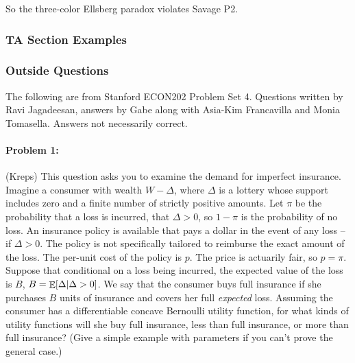 \documentclass[12pt]{article}
\begin{document}
\begin{enumerate}
	So the three-color Ellsberg paradox violates Savage P2.
\end{enumerate}



\subsubsection{TA Section Examples}

\subsubsection{Outside Questions}

The following are from Stanford ECON202 Problem Set 4. Questions written by Ravi Jagadeesan, answers by Gabe along with Asia-Kim Francavilla and Monia Tomasella. Answers not necessarily correct.

\paragraph{Problem 1:} (Kreps) This question asks you to examine the demand for imperfect insurance. Imagine a consumer with wealth $W - \Delta$, where $\Delta$ is a lottery whose support includes zero and a finite number of strictly positive amounts. Let $\pi$ be the probability that a loss is incurred, \ie that $\Delta > 0$, so $1 - \pi$ is the probability of no loss. An insurance policy is available that pays a dollar in the event of any loss -- \ie if $\Delta > 0$. The policy is not specifically tailored to reimburse the exact amount of the loss. The per-unit cost of the policy is $p$. The price is actuarily fair, so $p = \pi$. Suppose that conditional on a loss being incurred, the expected value of the loss is $B$, \ie $B = \mathop{\mathbb{E}}[\Delta | \Delta > 0]$. We say that the consumer buys full insurance if she purchases $B$ units of insurance and covers her full \emph{expected} loss. Assuming the consumer has a differentiable concave Bernoulli utility function, for what kinds of utility functions will she buy full insurance, less than full insurance, or more than full insurance? (Give a simple example with parameters if you can't prove the general case.)

\medskip
\end{document}

